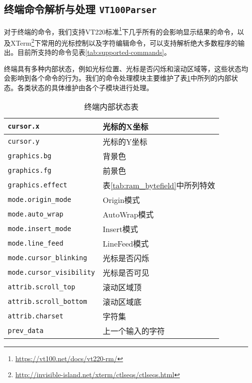  
\subsection{终端命令解析与处理 \texttt{VT100Parser}}

对于终端的命令，我们支持VT220标准\footnote{\url{https://vt100.net/docs/vt220-rm/}}下几乎所有的会影响显示结果的命令，以及XTerm\footnote{\url{http://invisible-island.net/xterm/ctlseqs/ctlseqs.html}}下常用的光标控制以及字符编辑命令，可以支持解析绝大多数程序的输出。目前所支持的命令见表\ref{tab:supported-commands}。

终端具有多种内部状态，例如光标位置、光标是否闪烁和滚动区域等，这些状态均会影响到各个命令的行为。我们的命令处理模块主要维护了表\ref{tab:inner-status}中所列的内部状态。各类状态的具体维护由各个子模块进行处理。

\begin{table}
	\centering
	\begin{tabular}{|l|l|} \hline
		\texttt{cursor.x} & 光标的X坐标 \\ \hline
		\texttt{cursor.y} & 光标的Y坐标 \\ \hline
		\texttt{graphics.bg} & 背景色 \\ \hline
		\texttt{graphics.fg} & 前景色 \\ \hline
		\texttt{graphics.effect} & 表\ref{tab:ram_bytefield}中所列特效 \\ \hline
		\texttt{mode.origin\_mode} & Origin模式 \\ \hline
		\texttt{mode.auto\_wrap} & AutoWrap模式 \\ \hline
		\texttt{mode.insert\_mode} & Insert模式 \\ \hline
		\texttt{mode.line\_feed} & LineFeed模式 \\ \hline
		\texttt{mode.cursor\_blinking} & 光标是否闪烁 \\ \hline
		\texttt{mode.cursor\_visibility} & 光标是否可见 \\ \hline
		\texttt{attrib.scroll\_top} & 滚动区域顶 \\ \hline
		\texttt{attrib.scroll\_bottom} & 滚动区域底 \\ \hline
		\texttt{attrib.charset} & 字符集 \\ \hline
		\texttt{prev\_data} & 上一个输入的字符 \\ \hline
	\end{tabular}
	\caption{终端内部状态表}
	\label{tab:inner-status}
\end{table}

